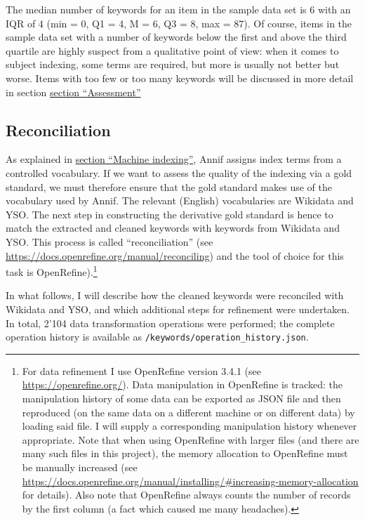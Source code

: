 The median number of keywords for an item in the sample data set is 6
with an IQR of 4 (min = 0, Q1 = 4, M = 6, Q3 = 8, max = 87). Of course,
items in the sample data set with a number of keywords below the first
and above the third quartile are highly suspect from a qualitative point
of view: when it comes to subject indexing, some terms are required, but
more is usually not better but worse. Items with too few or too many
keywords will be discussed in more detail in section
\protect\hyperlink{assessment}{section ``Assessment''}

\hypertarget{reconciliation}{%
\subsection{Reconciliation}\label{reconciliation}}

As explained in \protect\hyperlink{machine-indexing}{section ``Machine
indexing''}, Annif assigns index terms from a controlled vocabulary. If
we want to assess the quality of the indexing via a gold standard, we
must therefore ensure that the gold standard makes use of the vocabulary
used by Annif. The relevant (English) vocabularies are Wikidata and YSO.
The next step in constructing the derivative gold standard is hence to
match the extracted and cleaned keywords with keywords from Wikidata and
YSO. This process is called ``reconciliation'' (see
\url{https://docs.openrefine.org/manual/reconciling}) and the tool of
choice for this task is OpenRefine).\footnote{For data refinement I use
  OpenRefine version 3.4.1 (see \url{https://openrefine.org/}). Data
  manipulation in OpenRefine is tracked: the manipulation history of
  some data can be exported as JSON file and then reproduced (on the
  same data on a different machine or on different data) by loading said
  file. I will supply a corresponding manipulation history whenever
  appropriate. Note that when using OpenRefine with larger files (and
  there are many such files in this project), the memory allocation to
  OpenRefine must be manually increased (see
  \url{https://docs.openrefine.org/manual/installing/\#increasing-memory-allocation}
  for details). Also note that OpenRefine always counts the number of
  records by the first column (a fact which caused me many headaches).}

In what follows, I will describe how the cleaned keywords were
reconciled with Wikidata and YSO, and which additional steps for
refinement were undertaken. In total, 2'104 data transformation
operations were performed; the complete operation history is available
as \texttt{/keywords/operation\_history.json}.

